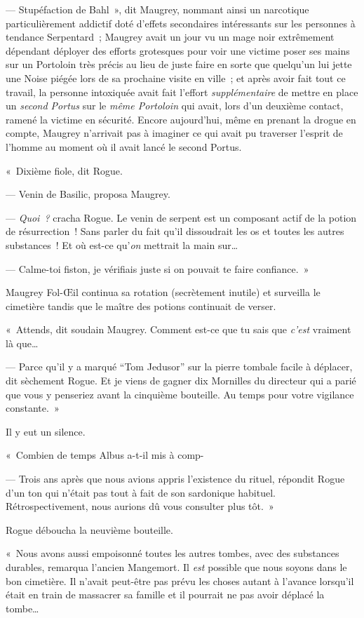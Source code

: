 --- Stupéfaction de Bahl~», dit Maugrey, nommant ainsi un narcotique particulièrement addictif doté d'effets secondaires intéressants sur les personnes à tendance Serpentard~; Maugrey avait un jour vu un mage noir extrêmement dépendant déployer des efforts grotesques pour voir une victime poser ses mains sur un Portoloin très précis au lieu de juste faire en sorte que quelqu'un lui jette une Noise piégée lors de sa prochaine visite en ville~; et après avoir fait tout ce travail, la personne intoxiquée avait fait l'effort \emph{supplémentaire} de mettre en place un \emph{second Portus} sur le \emph{même Portoloin} qui avait, lors d'un deuxième contact, ramené la victime en sécurité.
Encore aujourd'hui, même en prenant la drogue en compte, Maugrey n'arrivait pas à imaginer ce qui avait pu traverser l'esprit de l'homme au moment où il avait lancé le second Portus.

«~Dixième fiole, dit Rogue.

--- Venin de Basilic, proposa Maugrey.

--- \emph{Quoi~?} cracha Rogue.
Le venin de serpent est un composant actif de la potion de résurrection~!
Sans parler du fait qu'il dissoudrait les os et toutes les autres substances~!
Et où est-ce qu'\emph{on} mettrait la main sur…

--- Calme-toi fiston, je vérifiais juste si on pouvait te faire confiance.~»

Maugrey Fol-Œil continua sa rotation (secrètement inutile) et surveilla le cimetière tandis que le maître des potions continuait de verser.

«~Attends, dit soudain Maugrey.
Comment est-ce que tu sais que \emph{c'est} vraiment là que…

--- Parce qu'il y a marqué “Tom Jedusor” sur la pierre tombale facile à déplacer, dit sèchement Rogue.
Et je viens de gagner dix Mornilles du directeur qui a parié que vous y penseriez avant la cinquième bouteille.
Au temps pour votre vigilance constante.~»

Il y eut un silence.

«~Combien de temps Albus a-t-il mis à comp-

--- Trois ans après que nous avions appris l'existence du rituel, répondit Rogue d'un ton qui n'était pas tout à fait de son sardonique habituel.
Rétrospectivement, nous aurions dû vous consulter plus tôt.~»

Rogue déboucha la neuvième bouteille.

«~Nous avons aussi empoisonné toutes les autres tombes, avec des substances durables, remarqua l'ancien Mangemort.
Il \emph{est} possible que nous soyons dans le bon cimetière.
Il n'avait peut-être pas prévu les choses autant à l'avance lorsqu'il était en train de massacrer sa famille et il pourrait ne pas avoir déplacé la tombe…

